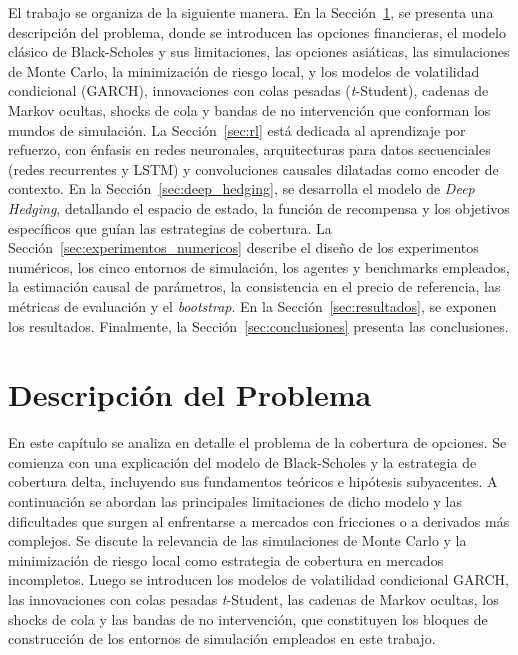 \documentclass[11pt,a4paper,spanish]{article}
\numberwithin{equation}{section} %
\begin{document}
El trabajo se organiza de la siguiente manera. En la Sección~\ref{sec:descripcion_problema}, se presenta una descripción del problema, donde se introducen las opciones financieras, el modelo clásico de Black-Scholes y sus limitaciones, las opciones asiáticas, las simulaciones de Monte Carlo, la minimización de riesgo local, y los modelos de volatilidad condicional (GARCH), innovaciones con colas pesadas (\textit{t}-Student), cadenas de Markov ocultas, shocks de cola y bandas de no intervención que conforman los mundos de simulación. La Sección~\ref{sec:rl} está dedicada al aprendizaje por refuerzo, con énfasis en redes neuronales, arquitecturas para datos secuenciales (redes recurrentes y LSTM) y convoluciones causales dilatadas como encoder de contexto. En la Sección~\ref{sec:deep_hedging}, se desarrolla el modelo de \textit{Deep Hedging}, detallando el espacio de estado, la función de recompensa y los objetivos específicos que guían las estrategias de cobertura. La Sección~\ref{sec:experimentos_numericos} describe el diseño de los experimentos numéricos, los cinco entornos de simulación, los agentes y benchmarks empleados, la estimación causal de parámetros, la consistencia en el precio de referencia, las métricas de evaluación y el \textit{bootstrap}. En la Sección~\ref{sec:resultados}, se exponen los resultados. Finalmente, la Sección~\ref{sec:conclusiones} presenta las conclusiones.

\newpage


\section{Descripción del Problema}\label{sec:descripcion_problema}

En este capítulo se analiza en detalle el problema de la cobertura de opciones. Se comienza con una explicación del modelo de Black-Scholes y la estrategia de cobertura delta, incluyendo sus fundamentos teóricos e hipótesis subyacentes. A continuación se abordan las principales limitaciones de dicho modelo y las dificultades que surgen al enfrentarse a mercados con fricciones o a derivados más complejos. Se discute la relevancia de las simulaciones de Monte Carlo y la minimización de riesgo local como estrategia de cobertura en mercados incompletos. Luego se introducen los modelos de volatilidad condicional GARCH, las innovaciones con colas pesadas \textit{t}-Student, las cadenas de Markov ocultas, los shocks de cola y las bandas de no intervención, que constituyen los bloques de construcción de los entornos de simulación empleados en este trabajo.
\end{document}
